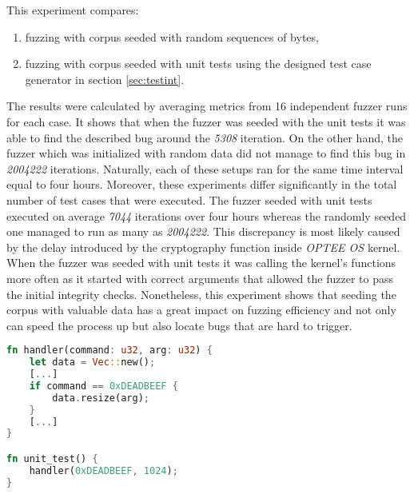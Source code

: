 
This experiment compares:
\begin{enumerate}
    \item fuzzing with corpus seeded with random sequences of bytes,
    \item fuzzing with corpus seeded with unit tests using the designed test case generator in section \ref{sec:testint}.
\end{enumerate}
The results were calculated by averaging metrics from 16 independent fuzzer runs for each case. It shows that when the fuzzer was seeded with the unit tests it was able to find the described bug around the \textit{5308} iteration. On the other hand, the fuzzer which was initialized with random data did not manage to find this bug in \textit{2004222} iterations. Naturally, each of these setups ran for the same time interval equal to four hours. Moreover, these experiments differ significantly in the total number of test cases that were executed. The fuzzer seeded with unit tests executed on average \textit{7044} iterations over four hours whereas the randomly seeded one managed to run as many as \textit{2004222}. This discrepancy is most likely caused by the delay introduced by the cryptography function inside \textit{OPTEE OS} kernel. When the fuzzer was seeded with unit tests it was calling the kernel's functions more often as it started with correct arguments that allowed the fuzzer to pass the initial integrity checks. Nonetheless, this experiment shows that seeding the corpus with valuable data has a great impact on fuzzing efficiency and not only can speed the process up but also locate bugs that are hard to trigger.

%    

\begin{minipage}{\linewidth}
    \begin{lstlisting}[language=rust,caption={The allocation bug pseudocode with a unit test.},label={lst:allocbug}]
fn handler(command: u32, arg: u32) {
    let data = Vec::new();
    [...]
    if command == 0xDEADBEEF {
        data.resize(arg);
    }
    [...]
}

fn unit_test() {
    handler(0xDEADBEEF, 1024);
}
    \end{lstlisting}
\end{minipage}
